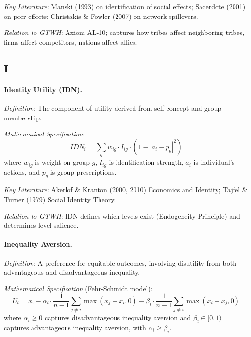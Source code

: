 \documentclass[12pt,a4paper]{article}
\begin{document}
\textit{Key Literature}: Manski (1993) on identification of social effects; 
Sacerdote (2001) on peer effects; Christakis \& Fowler (2007) on network spillovers.

\textit{Relation to GTWH}: Axiom AL-10; captures how tribes affect neighboring 
tribes, firms affect competitors, nations affect allies.

\subsection*{I}

\paragraph{Identity Utility (IDN).}
\textit{Definition}: The component of utility derived from self-concept and 
group membership.

\textit{Mathematical Specification}:
\begin{equation}
IDN_i = \sum_g w_{ig} \cdot I_{ig} \cdot \left(1 - |a_i - p_g|^2\right)
\end{equation}
where $w_{ig}$ is weight on group $g$, $I_{ig}$ is identification strength, 
$a_i$ is individual's actions, and $p_g$ is group prescriptions.

\textit{Key Literature}: Akerlof \& Kranton (2000, 2010) Economics and Identity; 
Tajfel \& Turner (1979) Social Identity Theory.

\textit{Relation to GTWH}: IDN defines which levels exist (Endogeneity Principle) 
and determines level salience.

\medskip

\paragraph{Inequality Aversion.}
\textit{Definition}: A preference for equitable outcomes, involving disutility 
from both advantageous and disadvantageous inequality.

\textit{Mathematical Specification} (Fehr-Schmidt model):
\begin{equation}
U_i = x_i - \alpha_i \cdot \frac{1}{n-1} \sum_{j \neq i} \max(x_j - x_i, 0) 
- \beta_i \cdot \frac{1}{n-1} \sum_{j \neq i} \max(x_i - x_j, 0)
\end{equation}
where $\alpha_i \geq 0$ captures disadvantageous inequality aversion and 
$\beta_i \in [0, 1)$ captures advantageous inequality aversion, with $\alpha_i \geq \beta_i$.
\end{document}

